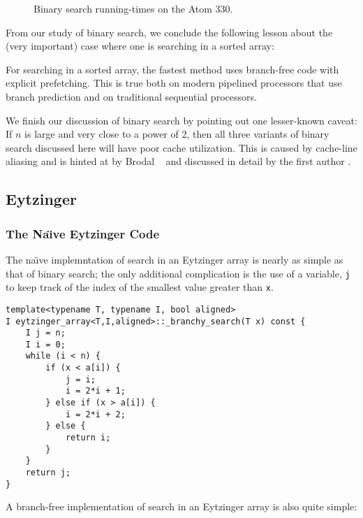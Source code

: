 \documentclass{patmorin}
\begin{document}
\begin{figure}
   \caption{Binary search running-times on the Atom 330.}
\end{figure}


From our study of binary search, we conclude the following lesson about
the (very important) case where one is searching in a sorted array:

\begin{lesson}
  For searching in a sorted array, the fastest method uses branch-free
  code with explicit prefetching.  This is true both on modern pipelined
  processors that use branch prediction and on traditional sequential
  processors.
\end{lesson}

We finish our discussion of binary search by pointing out one lesser-known
caveat:  If $n$ is large and very close to a power of 2, then all three
variants of binary search discussed here will have poor cache utilization.
This is caused by cache-line aliasing and is hinted at by Brodal \etal\
\cite{X} and discussed in detail by the first author \cite{X}.

\subsection{Eytzinger}

\subsubsection{The Na\"{\i}ve Eytzinger Code}

The na\"{\i}ve implemntation of search in an Eytzinger array is nearly
as simple as that of binary search; the only additional complication is
the use of a variable, \texttt{j} to keep track of the index
of the smallest value greater than \texttt{x}.

\begin{listing}
\begin{verbatim}
template<typename T, typename I, bool aligned>
I eytzinger_array<T,I,aligned>::_branchy_search(T x) const {
	I j = n;
	I i = 0;
	while (i < n) {
		if (x < a[i]) {
			j = i;
			i = 2*i + 1;
		} else if (x > a[i]) {
			i = 2*i + 2;
		} else {
			return i;
		}
	}
	return j;
}
\end{verbatim}
\end{listing}

A branch-free implementation of search in an Eytzinger array is also quite simple:
\end{document}
